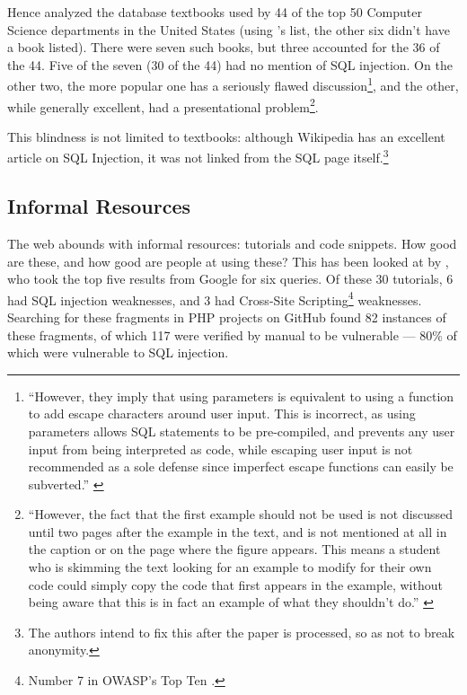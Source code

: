 \documentclass[conference]{IEEEtran}
\begin{document}
Hence \cite{Drop2019} analyzed the database textbooks used by  44 of the top 50 Computer Science
departments in the United States (using \cite{StangerMartin2015a}'s list, the other six didn't have a book listed). There were seven such books, but three accounted for the 36 of the 44. Five of the seven (30 of the 44) had no mention of SQL injection. On the other two, the more popular one has a seriously flawed discussion\footnote{``However, they imply that using parameters is equivalent to using a function to add escape characters
around user input. This is incorrect, as using parameters allows
SQL statements to be pre-compiled, and prevents any user input
from being interpreted as code, while escaping user input is not
recommended as a sole defense since imperfect escape functions
can easily be subverted.'' \cite{Drop2019}}, and the other, while generally excellent, had a presentational problem\footnote{``However, the fact that the first
example should not be used is not discussed until two pages after
the example in the text, and is not mentioned at all in the caption or
on the page where the figure appears. This means a student who is
skimming the text looking for an example to modify for their own
code could simply copy the code that first appears in the example,
without being aware that this is in fact an example of what they
shouldn't do.'' \cite{Drop2019}}.
\par
This blindness is not limited to textbooks: although Wikipedia has an excellent article on SQL Injection, it was not linked from the SQL page itself.\footnote{The authors intend to fix this after the paper is processed, so as not to break anonymity.}
\subsection{Informal Resources}\label{sec:informal}
The web abounds with informal resources: tutorials and code snippets. How good are these, and how good are people at using these? This has been looked at by \cite{Unruhetal2017a}, who took the top five results from Google for six queries. Of these 30 tutorials, 6 had SQL injection weaknesses, and 3 had Cross-Site Scripting\footnote{Number 7 in OWASP's Top Ten \cite{OWASP2017a}.} weaknesses. Searching for these fragments in PHP projects on GitHub found 82 instances of these fragments, of which 117 were verified by manual to be vulnerable --- 80\% of which were vulnerable to SQL injection.
\end{document}
